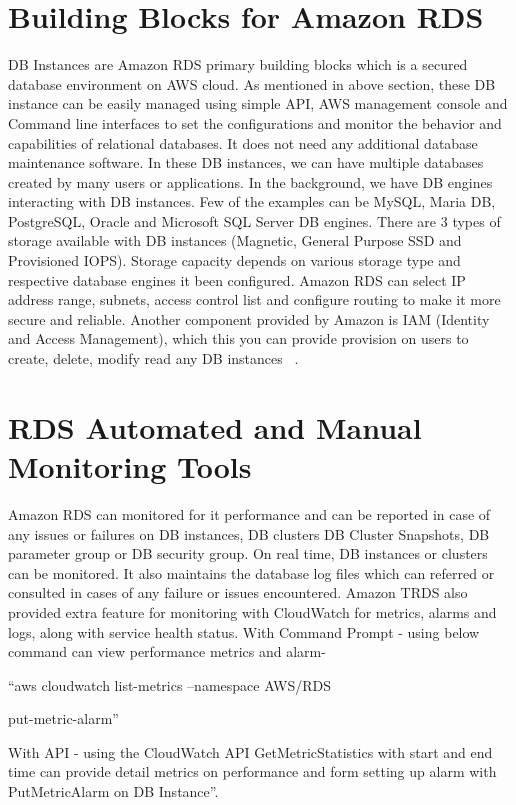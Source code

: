 \section{Building Blocks for Amazon RDS}

DB Instances are Amazon RDS primary building blocks which is a secured database 
environment on AWS cloud. As mentioned in above section, these DB instance can 
be easily managed using simple API, AWS management console and Command line 
interfaces to set the configurations and monitor the behavior and capabilities 
of relational databases. It does not need any additional database maintenance 
software. In these DB instances, we can have multiple databases created by many 
users or 
applications.
In the background, we have DB engines interacting with DB instances. Few of the 
examples can be MySQL, Maria DB, PostgreSQL, Oracle and Microsoft SQL Server DB 
engines.
There are 3 types of storage available with DB instances (Magnetic, General 
Purpose SSD and Provisioned IOPS).
Storage capacity depends on various storage type and respective database engines 
it been configured.
Amazon RDS can select IP address range, subnets, access control list and 
configure routing to make it more secure and reliable.
Another component provided by Amazon is IAM (Identity and Access Management), 
which this you can provide provision on users to create, delete, modify read 
any DB instances
~\cite{hid-sp18-520-amazonrdswel}.

\section{RDS Automated and Manual Monitoring Tools}

Amazon RDS can monitored for it performance and can be reported in case of 
any issues or failures on DB instances, DB clusters DB Cluster Snapshots, DB 
parameter group or DB security group.
On real time, DB instances or clusters can be monitored. It also maintains the 
database log files which can referred or consulted in cases of any failure or 
issues encountered.
Amazon TRDS also provided extra feature for monitoring with CloudWatch for 
metrics, alarms and logs, along with service health status.
With Command Prompt - using below command can view performance metrics and 
alarm- 

``aws cloudwatch list-metrics --namespace AWS/RDS

put-metric-alarm''

With API - using the CloudWatch API GetMetricStatistics with start and end time 
can provide detail metrics on performance and form setting up alarm 
with PutMetricAlarm on DB Instance''.

